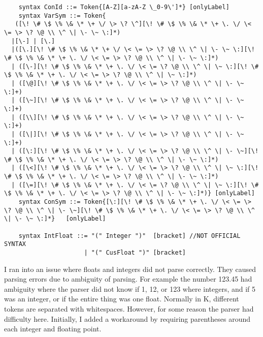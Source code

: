 \begin{lstlisting}
    syntax ConId ::= Token{[A-Z][a-zA-Z \_0-9\']*} [onlyLabel]
    syntax VarSym ::= Token{
   ([\! \# \$ \% \& \* \+ \/ \> \? \^][\! \# \$ \% \& \* \+ \. \/ \< \= \> \? \@ \\ \^ \| \- \~ \:]*)
  |[\-] | [\.]
  |([\.][\! \# \$ \% \& \* \+ \/ \< \= \> \? \@ \\ \^ \| \- \~ \:][\! \# \$ \% \& \* \+ \. \/ \< \= \> \? \@ \\ \^ \| \- \~ \:]*)
  | ([\-][\! \# \$ \% \& \* \+ \. \/ \< \= \? \@ \\ \^ \| \~ \:][\! \# \$ \% \& \* \+ \. \/ \< \= \> \? \@ \\ \^ \| \~ \:]*)
  | ([\@][\! \# \$ \% \& \* \+ \. \/ \< \= \> \? \@ \\ \^ \| \- \~ \:]+)
  | ([\~][\! \# \$ \% \& \* \+ \. \/ \< \= \> \? \@ \\ \^ \| \- \~ \:]+)
  | ([\\][\! \# \$ \% \& \* \+ \. \/ \< \= \> \? \@ \\ \^ \| \- \~ \:]+)
  | ([\|][\! \# \$ \% \& \* \+ \. \/ \< \= \> \? \@ \\ \^ \| \- \~ \:]+)
  | ([\:][\! \# \$ \% \& \* \+ \. \/ \< \= \> \? \@ \\ \^ \| \- \~][\! \# \$ \% \& \* \+ \. \/ \< \= \> \? \@ \\ \^ \| \- \~ \:]*)
  | ([\<][\! \# \$ \% \& \* \+ \. \/ \< \= \> \? \@ \\ \^ \| \~ \:][\! \# \$ \% \& \* \+ \. \/ \< \= \> \? \@ \\ \^ \| \- \~ \:]*)
  | ([\=][\! \# \$ \% \& \* \+ \. \/ \< \= \? \@ \\ \^ \| \~ \:][\! \# \$ \% \& \* \+ \. \/ \< \= \> \? \@ \\ \^ \| \- \~ \:]*)} [onlyLabel]
    syntax ConSym ::= Token{[\:][\! \# \$ \% \& \* \+ \. \/ \< \= \> \? \@ \\ \^ \| \- \~][\! \# \$ \% \& \* \+ \. \/ \< \= \> \? \@ \\ \^ \| \- \~ \:]*}   [onlyLabel]

    syntax IntFloat ::= "(" Integer ")"  [bracket] //NOT OFFICIAL SYNTAX
                      | "(" CusFloat ")" [bracket]
\end{lstlisting}
I ran into an issue where floats and integers did not parse correctly. They caused parsing errors due to ambiguity of parsing. For example the number 123.45 had ambiguity where the parser did not know if 1, 12, or 123 where integers, and if 5 was an integer, or if the entire thing was one float. Normally in K, different tokens are separated with whitespaces. However, for some reason the parser had difficulty here. Initially, I added a workaround by requiring parentheses around each integer and floating point.
